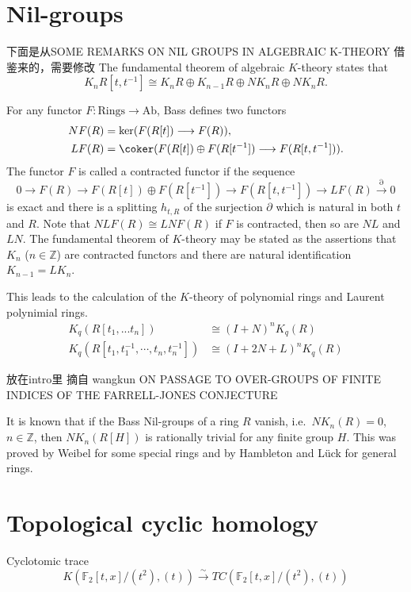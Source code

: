 \section{Nil-groups}
下面是从SOME REMARKS ON NIL GROUPS IN ALGEBRAIC K-THEORY 借鉴来的，需要修改
The fundamental theorem of algebraic $K$-theory states that
\[K_n R[t, t^{-1}] \cong K_n R \oplus K_{n-1}R \oplus NK_n R \oplus NK_n R .\]

For any functor $F \colon \mathrm{Rings} \longrightarrow \mathrm{Ab}$, Bass \cite{MR40:2736} defines two functors
\begin{align*}
NF(R) & = \ker(F(R[t]) \longrightarrow F(R)),\\
LF(R) & = \coker(F(R[t]) \oplus F(R[t^{-1}]) \longrightarrow F(R[t, t^{-1}])).
\end{align*}
The functor $F$ is called a contracted functor if the sequence
\[0 \longrightarrow F(R) \longrightarrow F(R[t]) \oplus F(R[t^{-1}]) \longrightarrow F(R[t, t^{-1}]) \longrightarrow LF(R) \overset{\partial}\longrightarrow 0\]
is exact and there is a splitting $h_{t,R}$ of the surjection $\partial$ which is natural in both $t$ and $R$. Note that $NLF(R)\cong LNF(R)$ if $F$ is contracted, then so are $NL$ and $LN$. The fundamental theorem of $K$-theory may be stated as the assertions that $K_n$ ($n\in \mathbb{Z}$) are contracted functors and there are natural identification $K_{n-1}=LK_n$.

This leads to the calculation of the $K$-theory of polynomial rings and Laurent polynimial rings.
\begin{align*}
K_q(R[t_1, . . . t_n]) &\cong (I + N)^n K_q(R)\\
K_q(R[t_1, t_1^{-1},\cdots ,t_n, t_n^{-1}]) &\cong (I + 2N + L)^n  K_q(R)
\end{align*}

放在intro里 摘自 wangkun ON PASSAGE TO OVER-GROUPS OF FINITE INDICES OF THE FARRELL-JONES CONJECTURE

It is known that if the Bass Nil-groups of a ring $R$ vanish, i.e.\ $NK_n(R) = 0$, $n \in \mathbb{Z}$, then $NK_n(R[H])$ is rationally trivial for any finite group $H$. This was proved by Weibel \cite{MR82k:18010} for some special rings and by Hambleton and L\"{u}ck \cite{Hambleton12inductionand} for general rings.



\section{Topological cyclic homology}
Cyclotomic trace
\[K(\mathbb{F}_2[t,x]/(t^2),(t))\overset{\sim}\longrightarrow TC(\mathbb{F}_2[t,x]/(t^2),(t)) \]



